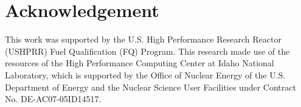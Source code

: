 \documentclass[review]{elsarticle}
\begin{document}
\section{Acknowledgement}
This work was supported by the U.S. High Performance Research Reactor (USHPRR) Fuel Qualification (FQ) Program. This research made use of the resources of the High Performance Computing Center at Idaho National Laboratory, which is supported by the Office of Nuclear Energy of the U.S. Department of Energy and the Nuclear Science User Facilities under Contract No. DE-AC07-05ID14517.


\end{document}
